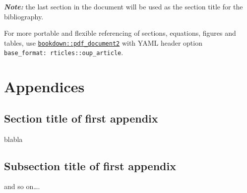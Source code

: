 \documentclass[webpdf,large,modern,namedate]{oup-authoring-template}
\theoremstyle{thmstyleone}
\theoremstyle{thmstyletwo}
\theoremstyle{thmstylethree}
\begin{document}
\textbf{\emph{Note:}} the last section in the document will be used as
the section title for the bibliography.

For more portable and flexible referencing of sections, equations,
figures and tables, use
\href{https://github.com/rstudio/bookdown}{\texttt{bookdown::pdf\_document2}}
with YAML header option \texttt{base\_format:\ rticles::oup\_article}.

\hypertarget{appendices}{%
\section*{Appendices}\label{appendices}}

\begin{appendices}

\hypertarget{section-title-of-first-appendix}{%
\section{Section title of first
appendix}\label{section-title-of-first-appendix}}

blabla

\hypertarget{subsection-title-of-first-appendix}{%
\subsection{Subsection title of first
appendix}\label{subsection-title-of-first-appendix}}

and so on\ldots.

\end{appendices}




\renewcommand\refname{References}




\end{document}
